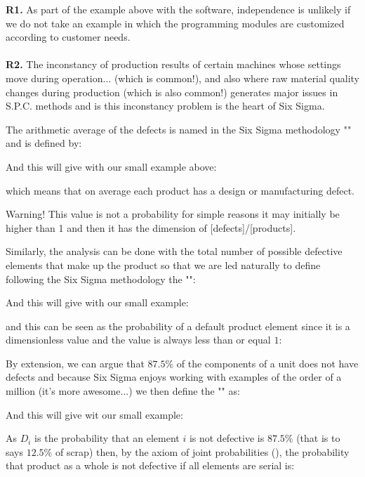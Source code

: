 	\begin{tcolorbox}[title=Remarks,colframe=black,arc=10pt]
\textbf{R1.} As part of the example above with the software, independence is unlikely if we do not take an example in which the programming modules are customized according to customer needs.\\\\
\textbf{R2.} The inconstancy of production results of certain machines whose settings move during operation... (which is common!), and also where raw material quality changes during production (which is also common!) generates major issues in S.P.C. methods and is this inconstancy problem is the heart of Six Sigma.
	\end{tcolorbox}
The arithmetic average of the defects is named in the Six Sigma methodology "" and is defined by:
	
And this will give with our small example above:
	
which means that on average each product has a design or manufacturing defect. 
	\begin{tcolorbox}[title=Remark,colframe=black,arc=10pt]
Warning! This value is not a probability for simple reasons it may initially be higher than 1 and then it has the dimension of [defects]/[products].
	\end{tcolorbox}

Similarly, the analysis can be done with the total number of possible defective elements that make up the product so that we are led naturally to define following the Six Sigma methodology the "":
	
And this will give with our small example:
	
and this can be seen as the probability of a default product element since it is a dimensionless value and the value is always less than or equal $1$:
	
By extension, we can argue that $87.5\%$ of the components of a unit does not have defects and because Six Sigma enjoys working with examples of the order of a million (it's more awesome...) we then define the "" as:
	
And this will give wit our small example:
	
	As $D_i$ is the probability that an element $i$ is not defective is $87.5\%$ (that is to says $12.5\%$ of scrap) then, by the axiom of joint probabilities (), the probability that product as a whole is not defective if all elements are serial is:
	
